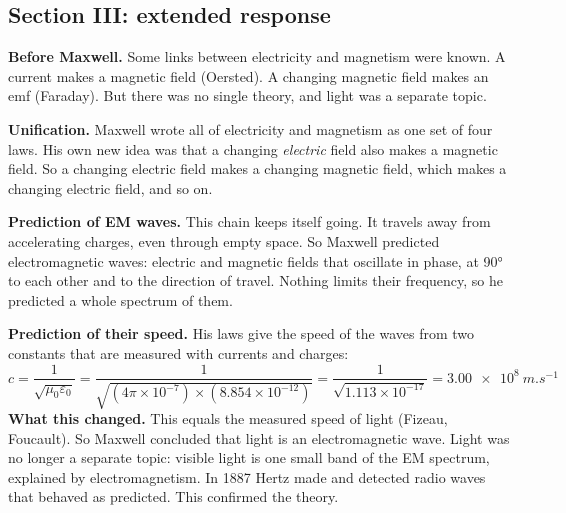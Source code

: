 \begin{practiceanswers}
\subsection*{Section III: extended response}

\begin{practiceans}
  \begin{modelanswer}
  \textbf{Before Maxwell.} Some links between electricity and magnetism were known. A current
  makes a magnetic field (Oersted). A changing magnetic field makes an emf (Faraday). But there
  was no single theory, and light was a separate topic.

  \textbf{Unification.} Maxwell wrote all of electricity and magnetism as one set of four laws.
  His own new idea was that a changing \emph{electric} field also makes a magnetic field. So a
  changing electric field makes a changing magnetic field, which makes a changing electric field,
  and so on.

  \textbf{Prediction of EM waves.} This chain keeps itself going. It travels away from
  accelerating charges, even through empty space. So Maxwell predicted electromagnetic waves:
  electric and magnetic fields that oscillate in phase, at \ang{90} to each other and to the
  direction of travel. Nothing limits their frequency, so he predicted a whole spectrum of them.

  \textbf{Prediction of their speed.} His laws give the speed of the waves from two constants
  that are measured with currents and charges:
  \[
    c = \frac{1}{\sqrt{\mu_0\varepsilon_0}}
      = \frac{1}{\sqrt{(4\pi\times10^{-7}) \times (8.854\times10^{-12})}}
      = \frac{1}{\sqrt{1.113\times10^{-17}}} = \qty{3.00e8}{m.s^{-1}}
  \]
  \textbf{What this changed.} This equals the measured speed of light (Fizeau, Foucault). So
  Maxwell concluded that light is an electromagnetic wave. Light was no longer a separate topic:
  visible light is one small band of the EM spectrum, explained by electromagnetism. In 1887
  Hertz made and detected radio waves that behaved as predicted. This confirmed the theory.
  \end{modelanswer}
  \begin{markingcriteria}
  \end{markingcriteria}
\end{practiceans}


\end{practiceanswers}
